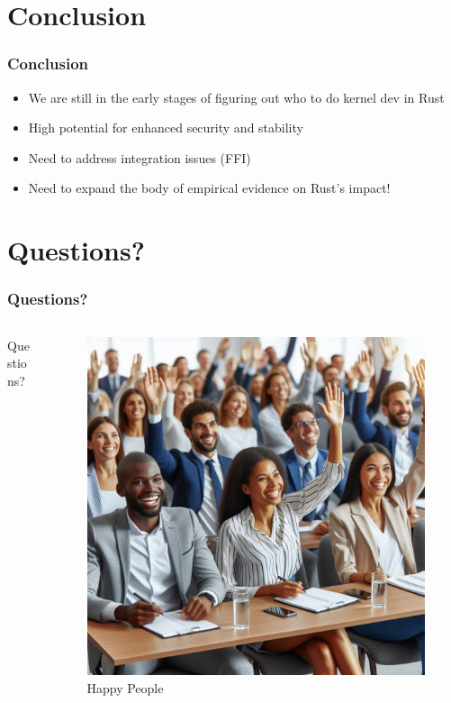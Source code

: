 \documentclass{beamer}
\begin{document}
\section{Conclusion}

\begin{frame}
  \frametitle{Conclusion}
  \begin{itemize}
  \item<1-> We are still in the early stages of figuring out who to do kernel dev in Rust
  \item<2-> High potential for enhanced security and stability
  \item<3-> Need to address integration issues (FFI)
  \item<4-> Need to expand the body of empirical evidence on Rust's impact!
  \end{itemize}

\end{frame}

\section{Questions?}

\begin{frame}
  \frametitle{Questions?}
  \begin{columns}
    \begin{column}{0.5\textwidth}
      Questions?
    \end{column}
    \begin{column}{0.5\textwidth}
      \begin{figure}
        \caption{Happy People\footnotemark[1]}
        \includegraphics[width=.8\textwidth]{images/questions.jpeg}\footnotemark[1]
      \end{figure}
    \end{column}
  \end{columns}
\end{frame}
\end{document}
